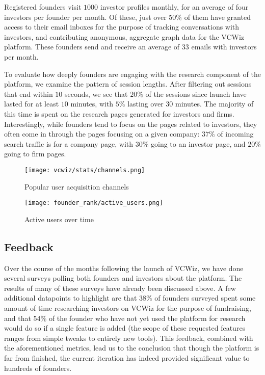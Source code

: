 Registered founders visit $1000$ investor profiles monthly, for an average of four investors per founder per month. Of these, just over $50\%$ of them have granted access to their email inboxes for the purpose of tracking conversations with investors, and contributing anonymous, aggregate graph data for the VCWiz platform. These founders send and receive an average of 33 emails with investors per month.

To evaluate how deeply founders are engaging with the research component of the platform, we examine the pattern of session lengths. After filtering out sessions that end within $10$ seconds, we see that $20\%$ of the sessions since launch have lasted for at least $10$ minutes, with $5\%$ lasting over 30 minutes. The majority of this time is spent on the research pages generated for investors and firms. Interestingly, while founders tend to focus on the pages related to investors, they often come in through the pages focusing on a given company: $37\%$ of incoming search traffic is for a company page, with $30\%$ going to an investor page, and $20\%$ going to firm pages.

\begin{figure}[ht]
  \centering
  \begin{minipage}[t]{0.5\textwidth}
    \centering
    \texttt{[image: vcwiz/stats/channels.png]}
    \caption{Popular user acquisition channels}
    \label{fig:acquisition}
  \end{minipage}\hfill
  \begin{minipage}[t]{0.5\textwidth}
    \centering
    \texttt{[image: founder\_rank/active\_users.png]}
    \caption{Active users over time}
    \label{fig:actives}
  \end{minipage}
\end{figure}

\subsection{Feedback}

Over the course of the months following the launch of VCWiz, we have done several surveys polling both founders and investors about the platform. The results of many of these surveys have already been discussed above. A few additional datapoints to highlight are that 38\% of founders surveyed spent some amount of time researching investors on VCWiz for the purpose of fundraising, and that 54\% of the founder who have not yet used the platform for research would do so if a single feature is added (the scope of these requested features ranges from simple tweaks to entirely new tools). This feedback, combined with the aforementioned metrics, lead us to the conclusion that though the platform is far from finished, the current iteration has indeed provided significant value to hundreds of founders.


